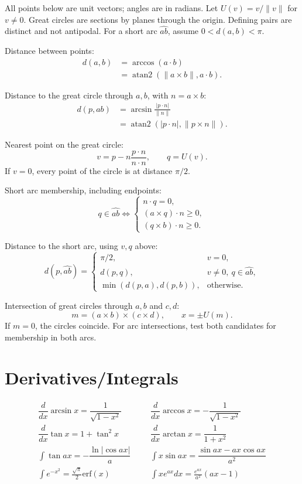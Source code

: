 All points below are unit vectors; angles are in radians.
Let $U(v)=v/\|v\|$ for $v\ne0$.
Great circles are sections by planes through the origin.
Defining pairs are distinct and not antipodal.
For a short arc $\widehat{ab}$, assume $0<d(a,b)<\pi$.

Distance between points:
\[\begin{aligned}
d(a,b)&=\arccos(a\cdot b)\\
&=\operatorname{atan2}(\|a\times b\|,a\cdot b).
\end{aligned}\]

Distance to the great circle through $a,b$, with $n=a\times b$:
\[\begin{aligned}
d(p,ab)&=\arcsin\frac{|p\cdot n|}{\|n\|}\\
&=\operatorname{atan2}(|p\cdot n|,\|p\times n\|).
\end{aligned}\]

Nearest point on the great circle:
\[
v=p-n\frac{p\cdot n}{n\cdot n},\qquad q=U(v).
\]
If $v=0$, every point of the circle is at distance $\pi/2$.

Short arc membership, including endpoints:
\[
q\in\widehat{ab}\iff
\begin{cases}
n\cdot q=0,\\
(a\times q)\cdot n\ge0,\\
(q\times b)\cdot n\ge0.
\end{cases}
\]

Distance to the short arc, using $v,q$ above:
\[
d(p,\widehat{ab})=
\begin{cases}
\pi/2,&v=0,\\
d(p,q),&v\ne0,\ q\in\widehat{ab},\\
\min(d(p,a),d(p,b)),&\text{otherwise}.
\end{cases}
\]

Intersection of great circles through $a,b$ and $c,d$:
\[
m=(a\times b)\times(c\times d),\qquad x=\pm U(m).
\]
If $m=0$, the circles coincide.
For arc intersections, test both candidates for membership in both arcs.

\section{Derivatives/Integrals}
\begin{align*}
	\dfrac{d}{dx}\arcsin x = \dfrac{1}{\sqrt{1-x^2}} &&& \dfrac{d}{dx}\arccos x = -\dfrac{1}{\sqrt{1-x^2}} \\
	\dfrac{d}{dx}\tan x = 1+\tan^2 x &&& \dfrac{d}{dx}\arctan x = \dfrac{1}{1+x^2} \\
	\int\tan ax = -\dfrac{\ln|\cos ax|}{a} &&& \int x\sin ax = \dfrac{\sin ax-ax \cos ax}{a^2} \\
	\int e^{-x^2} = \frac{\sqrt \pi}{2} \text{erf}(x) &&& \int xe^{ax}dx = \frac{e^{ax}}{a^2}(ax-1)
\end{align*}

